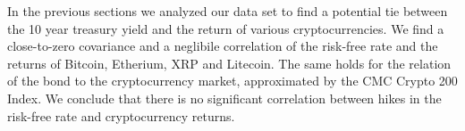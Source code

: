 In the previous sections we analyzed our data set to find a potential tie between the  10 year treasury yield and the return of various cryptocurrencies. We find a close-to-zero covariance and a neglibile correlation of the risk-free rate and the returns of Bitcoin, Etherium, XRP and Litecoin. The same holds for the relation of the bond to the cryptocurrency market, approximated by the CMC Crypto 200 Index. We conclude that there is no significant correlation between hikes in the risk-free rate and cryptocurrency returns.